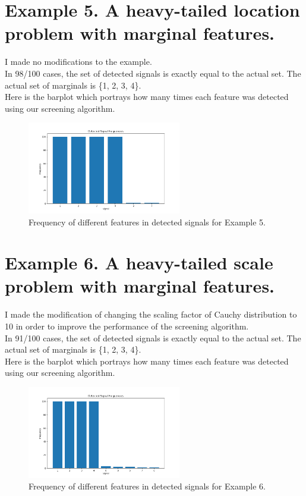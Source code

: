 \documentclass[12pt]{article}
\begin{document}
\section{Example 5. A heavy-tailed location problem with marginal features.}
I made no modifications to the example.\\
In 98/100 cases, the set of detected signals is exactly equal to the actual set. The actual set of marginals is \{1, 2, 3, 4\}.\\
Here is the barplot which portrays how many times each feature was detected using our screening algorithm.
\begin{figure}[H]
    \centering
    \includegraphics[width=0.6\textwidth]{eg5.png}
    \caption{Frequency of different features in detected signals for Example 5.}
\end{figure}

\section{Example 6. A heavy-tailed scale problem with marginal features.}
I made the modification of changing the scaling factor of Cauchy distribution to 10 in order to improve the performance of the screening algorithm.\\
In 91/100 cases, the set of detected signals is exactly equal to the actual set. The actual set of marginals is \{1, 2, 3, 4\}.\\
Here is the barplot which portrays how many times each feature was detected using our screening algorithm.
\begin{figure}[H]
    \centering
    \includegraphics[width=0.6\textwidth]{eg6.png}
    \caption{Frequency of different features in detected signals for Example 6.}
\end{figure}
\end{document}
